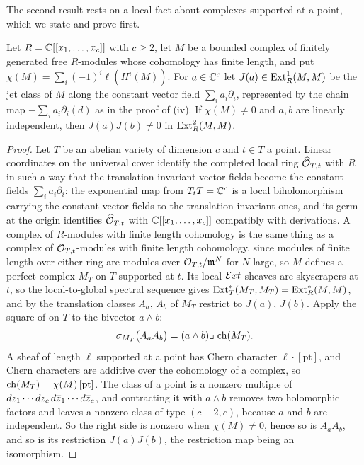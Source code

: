 The second result rests on a local fact about complexes supported at a point,
which we state and prove first.

\begin{lemma}
\label{lem:finiteproduct}
Let $R=\mathbb{C}[[x_{1},\dots,x_{c}]]$ with $c\ge2$, let $M$ be a bounded complex of
finitely generated free $R$-modules whose cohomology has finite length, and
put $\chi(M)=\sum_{i}(-1)^{i}\ell(H^{i}(M))$. For $a\in\mathbb{C}^{c}$ let
$J(a)\in\operatorname{Ext}^{1}_{R}(M,M)$ be the jet class of $M$ along the constant vector
field $\sum_{i}a_{i}\partial_{i}$, represented by the chain map
$-\sum_{i}a_{i}\partial_{i}(d)$ as in the proof of (iv).
If $\chi(M)\ne0$ and $a,b$ are linearly independent, then $J(a)J(b)\ne0$ in
$\operatorname{Ext}^{2}_{R}(M,M)$.
\end{lemma}

\begin{proof}
Let $T$ be an abelian variety of dimension $c$ and $t\in T$ a point. Linear
coordinates on the universal cover identify the completed local ring
$\widehat{\mathcal{O}}_{T,t}$ with $R$ in such a way that the translation invariant
vector fields become the constant fields $\sum_{i}a_{i}\partial_{i}$: the
exponential map from $T_{t}T=\mathbb{C}^{c}$ is a local biholomorphism carrying the
constant vector fields to the translation invariant ones, and its germ at the
origin identifies $\widehat{\mathcal{O}}_{T,t}$ with $\mathbb{C}[[x_{1},\dots,x_{c}]]$
compatibly with derivations. A complex of $R$-modules with finite length
cohomology is the same thing as a complex of $\mathcal{O}_{T,t}$-modules with finite
length cohomology, since modules of finite length over either ring are
modules over $\mathcal{O}_{T,t}/\mathfrak{m}^{N}$ for $N$ large, so $M$ defines a
perfect complex $M_{T}$ on $T$ supported at $t$. Its local $\mathcal{E} xt$ sheaves
are skyscrapers at $t$, so the local-to-global spectral sequence gives
$\operatorname{Ext}^{*}_{T}(M_{T},M_{T})=\operatorname{Ext}^{*}_{R}(M,M)$, and by  the
translation classes $A_{a}$, $A_{b}$ of $M_{T}$ restrict to $J(a)$, $J(b)$.
Apply the square of  on $T$ to the bivector $a\wedge b$:
\[
  \sigma_{M_{T}}\bigl(A_{a}A_{b}\bigr)=(a\wedge b)\lrcorner\,\operatorname{ch}(M_{T}).
\]
A sheaf of length $\ell$ supported at a point has Chern character
$\ell\cdot[\mathrm{pt}]$, and Chern characters are additive over the
cohomology of a complex, so $\operatorname{ch}(M_{T})=\chi(M)\,[\mathrm{pt}]$. The class of a
point is a nonzero multiple of $dz_{1}\cdots dz_{c}\,d\overline{z}_{1}\cdots
d\overline{z}_{c}$, and contracting it with $a\wedge b$ removes two holomorphic
factors and leaves a nonzero class of type $(c-2,c)$, because $a$ and $b$ are
independent. So the right side is nonzero when $\chi(M)\ne0$, hence so is
$A_{a}A_{b}$, and so is its restriction $J(a)J(b)$, the restriction map being
an isomorphism.
\end{proof}

